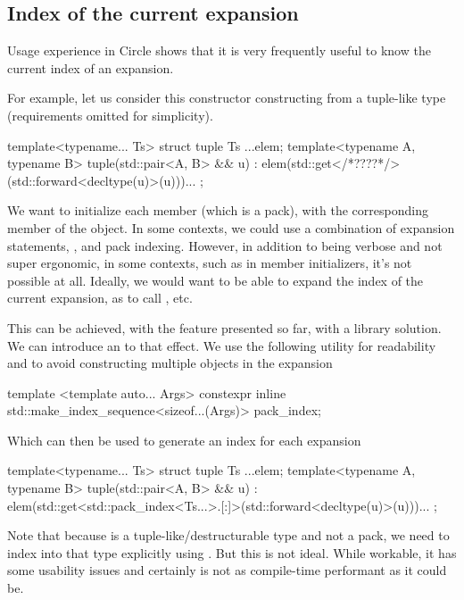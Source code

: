 \documentclass{wg21}
\begin{document}
\subsection{Index of the current expansion}

Usage experience in Circle shows that it is very frequently useful
to know the current index of an expansion.

For example, let us consider this  constructor constructing from a tuple-like type
(requirements omitted for simplicity).

\begin{colorblock}
template<typename... Ts>
struct tuple {
    Ts ...elem;
    template<typename A, typename B>
    tuple(std::pair<A, B> && u)
    : elem(std::get</*????*/>(std::forward<decltype(u)>(u)))... { }
};
\end{colorblock}

We want to initialize each member  (which is a pack), with the corresponding member of the  object.
In some contexts, we could use a combination of expansion statements, , and pack indexing.
However, in addition to being verbose and not super ergonomic, in some contexts, such as in member initializers, it's not possible at all.
Ideally, we would want to be able to expand the index of the current expansion, as to call , etc.

This can be achieved, with the feature presented so far, with a library solution.
We can introduce an  to that effect. We use the following utility for readability and to avoid constructing multiple objects in the expansion

\begin{colorblock}
template <template auto... Args>
constexpr inline std::make_index_sequence<sizeof...(Args)> pack_index;
\end{colorblock}

Which can then be used to generate an index for each expansion

\begin{colorblock}
template<typename... Ts>
struct tuple {
    Ts ...elem;
    template<typename A, typename B>
    tuple(std::pair<A, B> && u)
    : elem(std::get<std::pack_index<Ts...>.[:]>(std::forward<decltype(u)>(u)))... { }
};
\end{colorblock}

Note that because  is a tuple-like/destructurable type and not a pack, we need to index into that type explicitly using .
But this is not ideal. While workable, it has some usability issues and certainly is not as compile-time performant as it could be.
\end{document}
